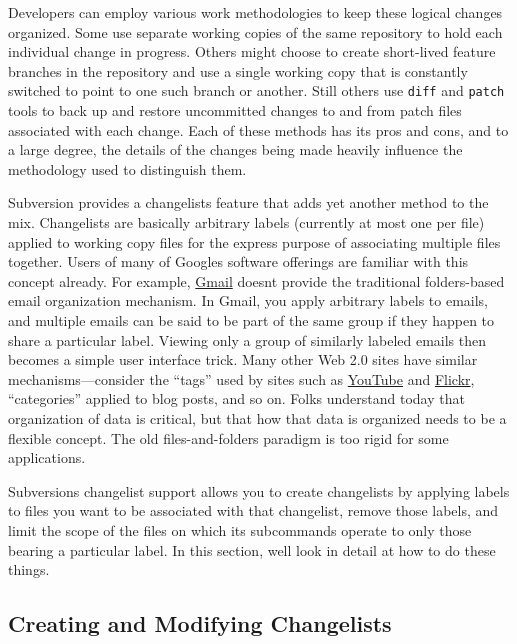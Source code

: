 Developers can employ various work methodologies to keep these logical
changes organized. Some use separate working copies of the same
repository to hold each individual change in progress. Others might
choose to create short-lived feature branches in the repository and use
a single working copy that is constantly switched to point to one such
branch or another. Still others use \texttt{diff} and \texttt{patch}
tools to back up and restore uncommitted changes to and from patch files
associated with each change. Each of these methods has its pros and
cons, and to a large degree, the details of the changes being made
heavily influence the methodology used to distinguish them.

Subversion provides a changelists feature that adds yet another method
to the mix. Changelists are basically arbitrary labels (currently at
most one per file) applied to working copy files for the express purpose
of associating multiple files together. Users of many of
Google\textquotesingle s software offerings are familiar with this
concept already. For example, \href{https://mail.google.com/}{Gmail}
doesn\textquotesingle t provide the traditional folders-based email
organization mechanism. In Gmail, you apply arbitrary labels to emails,
and multiple emails can be said to be part of the same group if they
happen to share a particular label. Viewing only a group of similarly
labeled emails then becomes a simple user interface trick. Many other
Web 2.0 sites have similar mechanisms---consider the ``tags'' used by
sites such as \href{https://www.youtube.com/}{YouTube} and
\href{https://www.flickr.com/}{Flickr}, ``categories'' applied to blog
posts, and so on. Folks understand today that organization of data is
critical, but that how that data is organized needs to be a flexible
concept. The old files-and-folders paradigm is too rigid for some
applications.

Subversion\textquotesingle s changelist support allows you to create
changelists by applying labels to files you want to be associated with
that changelist, remove those labels, and limit the scope of the files
on which its subcommands operate to only those bearing a particular
label. In this section, we\textquotesingle ll look in detail at how to
do these things.

\subsection{Creating and Modifying
Changelists}\label{svn.advanced.changelists.creating}

